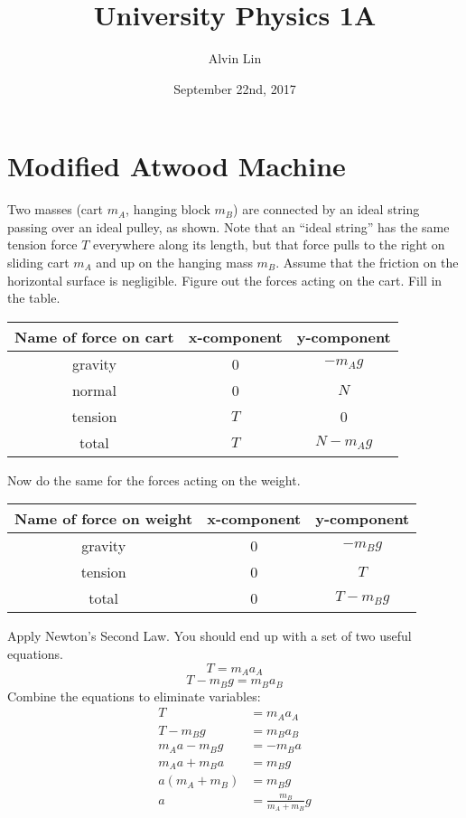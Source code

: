 \documentclass{math}
\title{University Physics 1A}
\author{Alvin Lin}
\date{September 22nd, 2017}
\begin{document}
\maketitle

\section*{Modified Atwood Machine}
Two masses (cart \( m_A \), hanging block \( m_B \)) are connected by an ideal
string passing over an ideal pulley, as shown. Note that an ``ideal string'' has
the same tension force \( T \) everywhere along its length, but that force pulls
to the right on sliding cart \( m_A \) and up on the hanging mass \( m_B \).
Assume that the friction on the horizontal surface is negligible. Figure
out the forces acting on the cart. Fill in the table.
\begin{center}
  \begin{tabular}{|c|c|c|}
    \hline
    \textbf{Name of force on cart} & \textbf{x-component} &
      \textbf{y-component} \\ \hline
    gravity & 0 & \( -m_Ag \) \\ \hline
    normal & 0 & \( N \) \\ \hline
    tension & \( T \) & 0 \\ \hline
    total & \( T \) & \( N-m_Ag \) \\ \hline
  \end{tabular}
\end{center}
Now do the same for the forces acting on the weight.
\begin{center}
  \begin{tabular}{|c|c|c|}
    \hline
    \textbf{Name of force on weight} & \textbf{x-component} &
      \textbf{y-component} \\ \hline
    gravity & 0 & \( -m_Bg \) \\ \hline
    tension & 0 & \( T \) \\ \hline
    total & 0 & \( T-m_Bg \) \\ \hline
  \end{tabular}
\end{center}
Apply Newton's Second Law. You should end up with a set of two useful
equations.
\[ T = m_Aa_A \]
\[ T-m_Bg = m_Ba_B \]
Combine the equations to eliminate variables:
\begin{align*}
  T &= m_Aa_A \\
  T-m_Bg &= m_Ba_B \\
  m_Aa-m_Bg &= -m_Ba \\
  m_Aa+m_Ba &= m_Bg \\
  a(m_A+m_B) &= m_Bg \\
  a &= \frac{m_B}{m_A+m_B}g
\end{align*}
\end{document}
